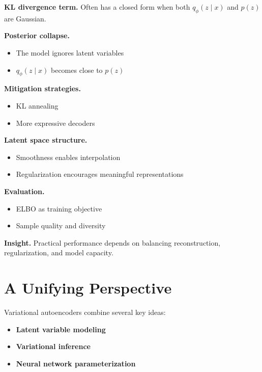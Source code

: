 \medskip

\noindent
\textbf{KL divergence term.}  
Often has a closed form when both $q_\phi(z \mid x)$ and $p(z)$ are Gaussian.

\medskip

\noindent
\textbf{Posterior collapse.}
\begin{itemize}
    \item The model ignores latent variables
    \item $q_\phi(z \mid x)$ becomes close to $p(z)$
\end{itemize}

\medskip

\noindent
\textbf{Mitigation strategies.}
\begin{itemize}
    \item KL annealing
    \item More expressive decoders
\end{itemize}

\medskip

\noindent
\textbf{Latent space structure.}
\begin{itemize}
    \item Smoothness enables interpolation
    \item Regularization encourages meaningful representations
\end{itemize}

\medskip

\noindent
\textbf{Evaluation.}
\begin{itemize}
    \item ELBO as training objective
    \item Sample quality and diversity
\end{itemize}

\medskip

\noindent
\textbf{Insight.}  
Practical performance depends on balancing reconstruction, regularization, and model capacity.

\section{A Unifying Perspective}

Variational autoencoders combine several key ideas:

\begin{itemize}
    \item \textbf{Latent variable modeling}
    \item \textbf{Variational inference}
    \item \textbf{Neural network parameterization}
\end{itemize}

